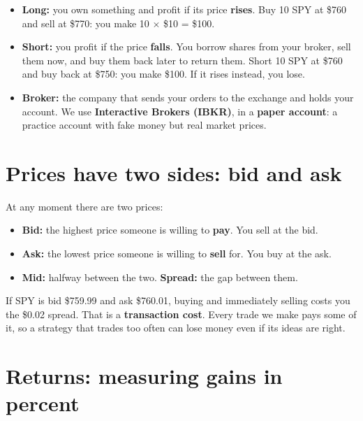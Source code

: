\documentclass{article}
\begin{document}
\begin{itemize}

\item \textbf{Long:} you own something and profit if its price \textbf{rises}. Buy 10 SPY at \$760 and sell at \$770: you make 10 \ensuremath{\times} \$10 = \$100.

\item \textbf{Short:} you profit if the price \textbf{falls}. You borrow shares from your broker, sell them now, and buy them back later to return them. Short 10 SPY at \$760 and buy back at \$750: you make \$100. If it rises instead, you lose.

\item \textbf{Broker:} the company that sends your orders to the exchange and holds your account. We use \textbf{Interactive Brokers (IBKR)}, in a \textbf{paper account}: a practice account with fake money but real market prices.

\end{itemize}

\section{Prices have two sides: bid and ask}

At any moment there are two prices:

\begin{itemize}

\item \textbf{Bid:} the highest price someone is willing to \textbf{pay}. You sell at the bid.

\item \textbf{Ask:} the lowest price someone is willing to \textbf{sell} for. You buy at the ask.

\item \textbf{Mid:} halfway between the two. \textbf{Spread:} the gap between them.

\end{itemize}

If SPY is bid \$759.99 and ask \$760.01, buying and immediately selling costs you the \$0.02 spread. That is a \textbf{transaction cost}. Every trade we make pays some of it, so a strategy that trades too often can lose money even if its ideas are right.

\section{Returns: measuring gains in percent}
\end{document}
